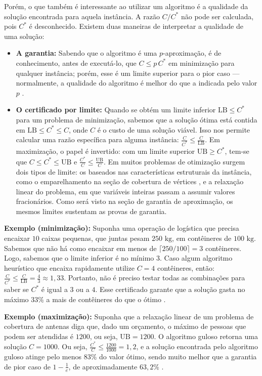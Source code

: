 Porém, o que também é interessante ao utilizar um algoritmo é a qualidade da solução encontrada para aquela instância. A razão $C/C^*$ não pode ser calculada, pois $C^*$ é desconhecido. Existem duas maneiras de interpretar a qualidade de uma solução:
\begin{itemize}
    \item \textbf{A garantia:} Sabendo que o algoritmo é uma $p$-aproximação, é de conhecimento, antes de executá-lo, que $C \le p\,C^*$ em minimização para qualquer instância; porém, esse é um limite superior para o pior caso — normalmente, a qualidade do algoritmo é melhor do que a indicada pelo valor $p$ \cite{cormen2012}.
    \item \textbf{O certificado por limite:} Quando se obtém um limite inferior $\mathrm{LB} \le C^*$ para um problema de minimização, sabemos que a solução ótima está contida em $\mathrm{LB} \le C^* \le C$, onde $C$ é o custo de uma solução viável. Isso nos permite calcular uma razão específica para alguma instância: $\frac{C}{C^*} \le \frac{C}{\mathrm{LB}}$. Em maximização, o papel é invertido: com um limite superior $\mathrm{UB} \ge C^*$, tem-se que $C \le C^* \le \mathrm{UB}$ e $\frac{C^*}{C} \le \frac{\mathrm{UB}}{C}$. Em muitos problemas de otimização surgem dois tipos de limite: os baseados nas características estruturais da instância, como o emparelhamento na seção de cobertura de vértices \cite[Seção~35.1]{cormen2012}, e a relaxação linear do problema, em que variáveis inteiras passam a assumir valores fracionários. Como será visto na seção de garantia de aproximação, os mesmos limites sustentam as provas de garantia.
\end{itemize}

\textbf{Exemplo (minimização):} Suponha uma operação de logística que precisa encaixar $10$ caixas pequenas, que juntas pesam $250\text{ kg}$, em contêineres de $100\text{ kg}$. Sabemos que não há como encaixar em menos de $\lceil 250/100 \rceil = 3$ contêineres. Logo, sabemos que o limite inferior é no mínimo $3$. Caso algum algoritmo heurístico que encaixa rapidamente utilize $C = 4$ contêineres, então: $\frac{C}{C^*} \le \frac{C}{\mathrm{LB}} = \frac{4}{3} \approx 1{,}33$. Portanto, não é preciso testar todas as combinações para saber se $C^*$ é igual a $3$ ou a $4$. Esse certificado garante que a solução gasta no máximo $33\%$ a mais de contêineres do que o ótimo \cite{cormen2012}.

\textbf{Exemplo (maximização):} Suponha que a relaxação linear de um problema de cobertura de antenas diga que, dado um orçamento, o máximo de pessoas que podem ser atendidas é $1200$, ou seja, $\mathrm{UB} = 1200$. O algoritmo guloso retorna uma solução $C = 1000$. Ou seja, $\frac{C^*}{C} \le \frac{1200}{1000} = 1{,}2$, e a solução encontrada pelo algoritmo guloso atinge pelo menos $83\%$ do valor ótimo, sendo muito melhor que a garantia de pior caso de $1 - \frac{1}{e}$, de aproximadamente $63{,}2\%$ \cite{nemhauser1978}.

